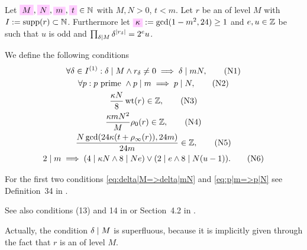 \documentclass{article}
\begin{document}
\begin{Definition}\cite[Def.~35]{Radu_RamanujanKolberg_2015}
  \label{def:condition-co-eta-quotient-gamma0}
  Let
  $\defineNotation[M]{M}, \defineNotation[N]{N},
  \defineNotation[m]{m}, \defineNotation{t} \in \setN$ with $M,N>0$,
  $t<m$.
  Let $r$ be an  of level $M$
  with $I := \operatorname{supp}(r) \subset \mathbb{N}$.
  Furthermore let $\defineNotation[kappa]{\kappa} :=\gcd(1-m^2,
  24)\ge1$
  and $e, u\in\mathbb{Z}$ be such that $u$ is odd and
  $\prod_{\delta \mid M} \delta^{\lvert r_\delta\rvert}=2^e u$.


  We define the following conditions
  \begin{gather}
    \forall \delta \in I^{(1)}:
    \delta \mid M \land r_\delta\ne0 \implies \delta \mid mN,
    \tag{N1}
    \label{eq:delta|M=>delta|mN}
    \\
    \forall p:
    p\text{ prime } \land p \mid m \implies p \mid N,
    \tag{N2}
    \label{eq:p|m=>p|N}
    \\
    \frac{\kappa N}{8} \operatorname{wt}(r) \in \mathbb{Z},
    \tag{N3}
    \label{eq:sum-r}
    \\
    \frac{\kappa m N^2}{M} \rho_0(r) \in \mathbb{Z},
    \tag{N4}
    \label{eq:rv24}
    \\
    \frac{N \gcd(24 \kappa(t + \rho_\infty(r)),24m)}{24m} \in \mathbb{Z},
    \tag{N5}
    \label{eq:w|N}
    \\
    2 \mid m \implies (4 \mid \kappa N \land 8 \mid N e)
    \lor
    (2 \mid e \land 8 \mid N(u-1)).
    \tag{N6}
    \label{eq:even-m}
  \end{gather}
\end{Definition}

For the first two conditions \eqref{eq:delta|M=>delta|mN} and
\eqref{eq:p|m=>p|N} see Definition~34 in
\cite{Radu_RamanujanKolberg_2015}.

\begin{AdditionalInformation}
  See also conditions (13) and 14 in
  \cite{Radu_AlgorithmicApproachRamanujanCongruences_2009} or
  Section~4.2 in \cite{Radu_PhD_2010}.
\end{AdditionalInformation}

Actually, the condition $\delta \mid M$ is superfluous, because
it is implicitly given through the fact that $r$ is an  of level $M$.
\end{document}

